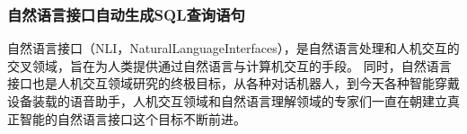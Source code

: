 



\subsubsection{自然语言接口自动生成SQL查询语句}
\label{intro:nli2sql}
自然语言接口（NLI，NaturalLanguageInterfaces），是自然语言处理和人机交互的交叉领域，旨在为人类提供通过自然语言与计算机交互的手段。
同时，自然语言接口也是人机交互领域研究的终极目标，从各种对话机器人，到今天各种智能穿戴设备装载的语音助手，人机交互领域和自然语言理解领域的专家们一直在朝建立真正智能的自然语言接口这个目标不断前进。


